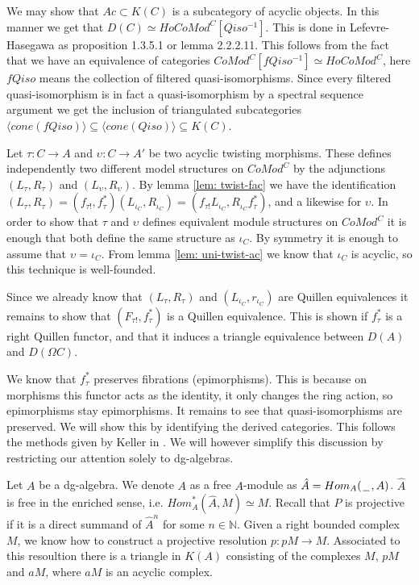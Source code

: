 \documentclass[../thesis.tex]{subfiles}
\begin{document}
            \begin{remark}
                We may show that $Ac\subset K(C)$ is a subcategory of acyclic objects. In this manner we get that $D(C) \simeq HoCoMod^C[Qiso^{-1}]$. This is done in Lefevre-Hasegawa \cite{LefevreHasegawa03} as proposition 1.3.5.1 or lemma 2.2.2.11. This follows from the fact that we have an equivalence of categories $CoMod^C[fQiso^{-1}]\simeq HoCoMod^C$, here $fQiso$ means the collection of filtered quasi-isomorphisms. Since every filtered quasi-isomorphism is in fact a quasi-isomorphism by a spectral sequence argument we get the inclusion of triangulated subcategories $\langle cone(fQiso)\rangle \subseteq \langle cone(Qiso)\rangle \subseteq K(C)$.
            \end{remark}

            Let $\tau: C \rightarrow A$ and $\upsilon : C \rightarrow A'$ be two acyclic twisting morphisms. These defines independently two different model structures on $CoMod^C$ by the adjunctions $(L_\tau, R_\tau)$ and $(L_\upsilon, R_\upsilon)$. By lemma \ref{lem: twist-fac} we have the identification $(L_\tau, R_\tau) = (f_{\tau !},f_\tau^*)(L_{\iota_C},R_{\iota_C}) = (f_{\tau !}L_{\iota_C},R_{\iota_C}f_\tau^*)$, and a likewise for $\upsilon$. In order to show that $\tau$ and $\upsilon$ defines equivalent module structures on $CoMod^C$ it is enough that both define the same structure as $\iota_C$. By symmetry it is enough to assume that $\upsilon = \iota_C$. From lemma \ref{lem: uni-twist-ac} we know that $\iota_C$ is acyclic, so this technique is well-founded.

            Since we already know that $(L_\tau, R_\tau)$ and $(L_{\iota_C}, r_{\iota_C})$ are Quillen equivalences it remains to show that $(F_{\tau !},f_\tau^*)$ is a Quillen equivalence. This is shown if $f_\tau^*$ is a right Quillen functor, and that it induces a triangle equivalence between $D(A)$ and $D(\Omega C)$.

            We know that $f_\tau^*$ preserves fibrations (epimorphisms). This is because on morphisms this functor acts as the identity, it only changes the ring action, so epimorphisms stay epimorphisms. It remains to see that quasi-isomorphisms are preserved. We will show this by identifying the derived categories. This follows the methods given by Keller in \cite{Keller94}. We will however simplify this discussion by restricting our attention solely to dg-algebras.

            Let $A$ be a dg-algebra. We denote $A$ as a free $A$-module as $\hat{A} = Hom_A(\hspace{0.05cm}\underline{\hspace{0.2cm}}\hspace{0.05cm},A)$. $\hat{A}$ is free in the enriched sense, i.e. ${Hom}^*_A(\hat{A},M) \simeq M$.  Recall that $P$ is projective if it is a direct summand of $\hat{A}^n$ for some $n\in \mathbb{N}$. Given a right bounded complex $M$, we know how to construct a projective resolution $p: pM \rightarrow M$. Associated to this resoultion there is a triangle in $K(A)$ consisting of the complexes $M$, $pM$ and $aM$, where $aM$ is an acyclic complex.
\end{document}
